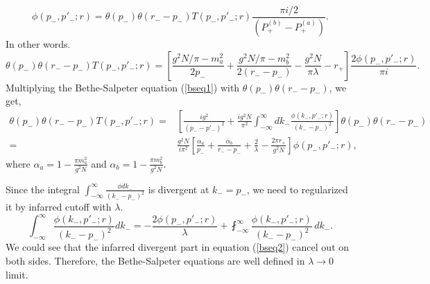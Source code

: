 \documentclass{article}
\newcommand{\bref}[1]{(\ref{#1})}
\begin{document}
\[ 
   \phi(p_{-}, p{}'_{-};r) = \theta(p_{-})\theta(r_{-}- p_{-})T(p_{-}, p{}'_{-};r) \frac{\pi i/2}{\left(P^{(b)}_{+} - P^{(a)}_{+}\right)}.
\] 
In other words.
\[ 
   \theta(p_{-})\theta(r_{-}-p_{-})T(p_{-}, p{}'_{-};r)= \left[\frac{g^{2}N/\pi -m^{2}_{a}}{2p_{-}} + \frac{g^{2}N/\pi -m_{b}^{2}}{2\left(r_{-}-p_{-}\right)} - \frac{g^{2}N}{\pi \lambda }- r_{+}\right] \frac{2\phi (p_{-}, p{}'_{-}; r)}{\pi i}.
\] 
Multiplying the Bethe-Salpeter equation \bref{bseq1} with $\theta (p_{-})\theta (r_{-} - p_{-})$, we get, 
\begin{align}
  \theta (p_{-})\theta (r_{-} - p_{-})T(p_{-}, p{}'_{-}; r) = & \left[\frac{ig^{2}}{(p_{-}-p{}'_{-})^{2}} + \frac{ig^{2}N}{\pi ^{2}}\int_{-\infty}^{\infty} dk_{-}\frac{\phi (k_{-}, p{}'_{-};r)}{(k_{-}- p_{-})^{2}}\right]\theta (p_{-})\theta (r_{-}-p_{-}) \nonumber \\
  =  & \frac{g^{2}N}{i\pi ^{2}}\left[\frac{\alpha_{a}}{p_{-}} + \frac{\alpha_{b}}{r_{-}-p_{-}} + \frac{2}{\lambda } - \frac{2\pi r_{+}}{g^{2}N}\right]\phi (p_{-}, p{}'_{-}; r),
\label{bseq2}
\end{align}
where $\alpha_{a} = 1 - \frac{\pi m_{a}^{2}}{g^{2}N}$ and $\alpha_{b} = 1 - \frac{\pi m_{b}^{2}}{g^{2}N}$.

 Since the integral $\int_{-\infty}^{\infty}  \frac{\phi dk_{-} }{(k_{-} - p_{-})^{2}}$ is divergent at $k_{-} = p_{-}$, we need to regularized it by infarred cutoff with $\lambda$. 
\[ 
    \int_{-\infty}^{\infty} \frac{\phi (k_{-}, p{}'_{-};r)}{(k_{-}-p_{-})^{2}} dk_{-} = - \frac{2\phi (p_{-}, p{}'_{-}; r)}{\lambda } + \fint_{-\infty}^{\infty} \frac{\phi(k_{-}, p{}'_{-};r)}{(k_{-}-p_{-})^{2}}\, dk_{-}.
\] 
We could see that the infarred divergent part in equation \bref{bseq2} cancel out on both sides. Therefore, the Bethe-Salpeter equations are well defined in $\lambda \rightarrow 0$ limit.
\end{document}
